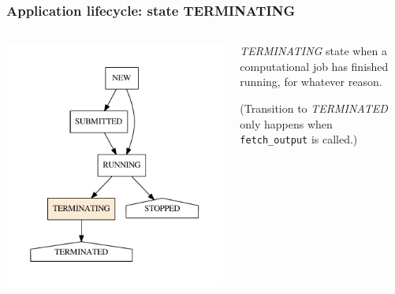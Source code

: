 \documentclass[english,serif,mathserif,xcolor=pdftex,dvipsnames,table]{beamer}
\begin{document}
\begin{frame}[fragile]
\frametitle{Application lifecycle: state TERMINATING}

\begin{columns}[c]
  \begin{column}{0.5\textwidth}
    \includegraphics[height=0.7\textheight]{fig/states-TERMINATING}
  \end{column}
  \begin{column}{0.5\textwidth}
    \raggedleft
    \emph{TERMINATING} state when a computational job has finished
    running, for whatever reason.

    \+
    (Transition to \emph{TERMINATED} only happens when \texttt{fetch\_output} is called.)
  \end{column}
\end{columns}
\end{frame}
\end{document}
